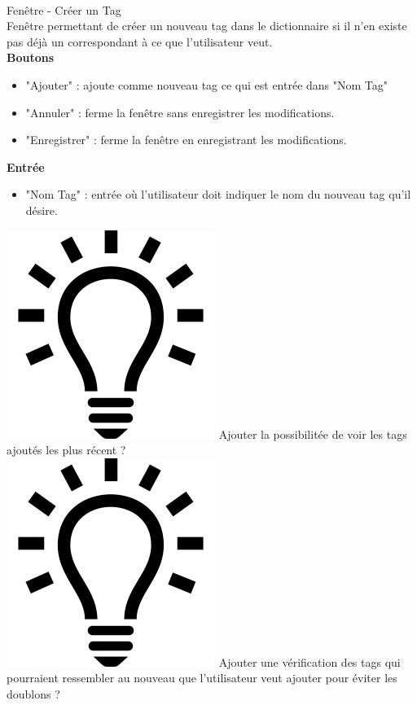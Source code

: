 \documentclass[11pt,french,a4paper]{report}
\begin{document}
\dotfill \\

\Large Fenêtre - Créer un Tag\normalsize \\
    Fenêtre permettant de créer un nouveau tag dans le dictionnaire si il n'en existe pas déjà
    un correspondant à ce que l'utilisateur veut. \\
\large \textbf{Boutons}\normalsize
    \begin{itemize}[label=, leftmargin=*,parsep=0cm,itemsep=0cm,topsep=0cm]
        \item "Ajouter" : ajoute comme nouveau tag ce qui est entrée dans "Nom Tag"
        \item "Annuler" : ferme la fenêtre sans enregistrer les modifications.
        \item "Enregistrer" : ferme la fenêtre en enregistrant les modifications.
    \end{itemize}
\large \textbf{Entrée}\normalsize
    \begin{itemize}[label=, leftmargin=*,parsep=0cm,itemsep=0cm,topsep=0cm]
        \item "Nom Tag" : entrée où l'utilisateur doit indiquer le nom du nouveau tag qu'il désire.
    \end{itemize}
    \includegraphics[scale=0.05]{../images/logo/logo_ampoule} Ajouter la possibilitée de voir les tags ajoutés 
            les plus récent ? \\ 
    \includegraphics[scale=0.05]{../images/logo/logo_ampoule} Ajouter une vérification des tags qui pourraient 
    ressembler au nouveau que l'utilisateur veut ajouter pour éviter les doublons ? \\
\end{document}
